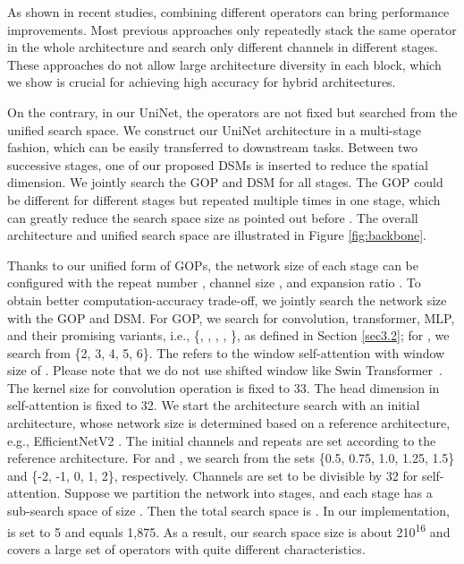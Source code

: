 \documentclass[runningheads]{llncs}
\begin{document}
As shown in recent studies, combining different operators \cite{cvt,yuan2021incorporating} can bring performance improvements. Most previous approaches only repeatedly stack the same operator in the whole architecture and search only different channels in different stages. These approaches do not allow large architecture diversity in each block, which we show is crucial for achieving high accuracy for hybrid architectures.

On the contrary, in our UniNet, the operators are not fixed but searched from the unified search space. We construct our UniNet architecture in a multi-stage fashion, which can be easily transferred to downstream tasks. Between two successive stages, one of our proposed DSMs is inserted to reduce the spatial dimension. We jointly search the GOP and DSM for all stages. The GOP could be different for different stages but repeated multiple times in one stage, which can greatly reduce the search space size as pointed out before \cite{mnas}. The overall architecture and unified search space are illustrated in Figure \ref{fig:backbone}. 

Thanks to our unified form of GOPs, the network size of each stage can be configured with the repeat number , channel size , and expansion ratio . To obtain better computation-accuracy trade-off, we jointly search the network size with the GOP and DSM. For GOP, we search for convolution, transformer, MLP, and their promising variants, i.e., \{, , , , \}, 
as defined in Section \ref{sec3.2}; for , we search from \{2, 3, 4, 5, 6\}. The  refers to the window self-attention with window size of . Please note that we do not use shifted window like Swin Transformer~\cite{swin}.
The kernel size for convolution operation is fixed to 33. The head dimension in self-attention is fixed to 32. 
We start the architecture search with an initial architecture, whose network size is determined based on a reference architecture, e.g., EfficientNetV2 \cite{effnetv2}. The initial channels and repeats are set according to the reference architecture.
For  and , we search from the sets \{0.5, 0.75, 1.0, 1.25, 1.5\} and \{-2, -1, 0, 1, 2\}, respectively. Channels are set to be divisible by 32 for self-attention.
Suppose we partition the network into  stages, and each stage has a sub-search space of size . Then the total search space is . In our implementation,  is set to 5 and  equals 1,875. As a result, our search space size is about 210\textsuperscript{16} and covers a large set of operators with quite different characteristics.
\end{document}
